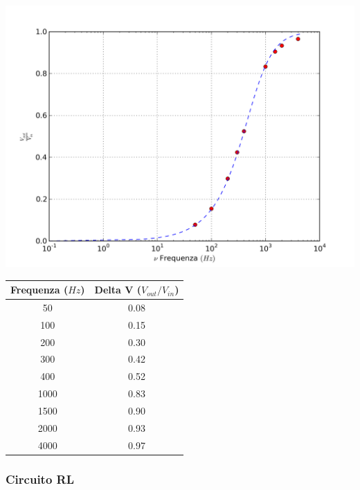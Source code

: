 \begin{center}
 \includegraphics[scale=0.50]{grafici/C3/ddpcond.png}
\end{center}

\begin{center}
\begin{tabular}{*{2}{c}}
Frequenza ($Hz$) & Delta V ($V_{out}/V_{in}$) \\
\midrule
50 & 0.08 \\
100 & 0.15 \\
200 & 0.30 \\
300 & 0.42 \\
400 & 0.52 \\
1000 & 0.83 \\
1500 & 0.90 \\
2000 & 0.93 \\
4000 & 0.97 \\
\end{tabular}
\end{center}


\subsubsection{Circuito RL}

